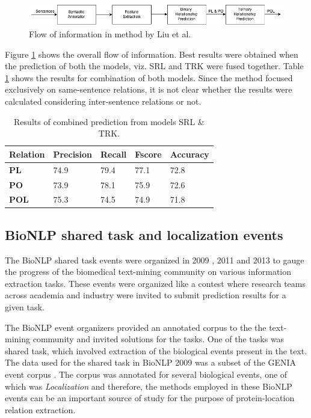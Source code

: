 \begin{figure}
\includegraphics[scale=0.5]{figures/Liu_Flow.png}
\caption{Flow of information in method by Liu et al.}\label{fig:LiuFlow}
\end{figure}

Figure \ref{fig:LiuFlow} shows the overall flow of information. Best results were obtained when the prediction of both the models, viz. SRL and TRK were fused together. Table \ref{tab:LiuRes} shows the results for combination of both models. Since the method focused exclusively on same-sentence relations, it is not clear whether the results were calculated considering inter-sentence relations or not.

\begin{table}
\centering
\begin{tabular}{|l|l|l|l|l|}
\hline
\textbf{Relation} & \textbf{Precision} & \textbf{Recall} & \textbf{Fscore} & \textbf{Accuracy} \\ \hline
\textbf{PL} & 74.9 & 79.4 & 77.1 & 72.8 \\
\textbf{PO} & 73.9 & 78.1 & 75.9 & 72.6 \\
\textbf{POL} & 75.3 & 74.5 & 74.9 &  71.8\\ \hline
\end{tabular}
\caption{Results of combined prediction from models SRL \& TRK.}\label{tab:LiuRes}
\end{table}

\subsection{BioNLP shared task and localization events}

The BioNLP shared task events were organized in 2009 \cite{kim2009overview}, 2011 and 2013 to gauge the progress of the biomedical text-mining community on various information extraction tasks. These events were organized like a contest where research teams across academia and industry were invited to submit prediction results for a given task. 

The BioNLP event organizers provided an annotated corpus to the the text-mining community and invited solutions for the tasks. One of the tasks was shared task,  which involved extraction of the biological events present in the text. The data used for the shared task in BioNLP 2009 was a subset of the GENIA event corpus \cite{kim2008corpus}. The corpus was annotated for several biological events, one of which was \textit{Localization} and therefore, the methods employed in these BioNLP events can be an important source of study for the purpose of protein-location relation extraction.


